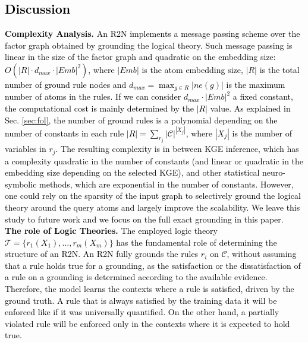 \documentclass[journal]{IEEEtran}
\newcommand{\mc}{\mathcal}
\newcommand{\ar}[1]{\textcolor{black}{#1}}
\begin{document}
\ar{\subsection{Discussion}\label{sec:discussion}}
\ar{{\bf Complexity Analysis. } An R2N implements a message passing scheme over the factor graph obtained by grounding the logical theory. Such message passing is linear in the size of the factor graph and quadratic on the embedding size: $O(|R| \cdot d_{max} \cdot |Emb|^2)$, where $|Emb|$ is the atom embedding size, $|R|$ is the total number of ground rule nodes and $d_{max} = \max_{g \in R} |ne(g)|$ is the maximum number of atoms in the rules.
If we can consider $d_{max} \cdot |Emb|^2$ a fixed constant, the computational cost is mainly determined by the $|R|$ value. As explained in Sec. \ref{sec:fol}, the number of ground rules is a polynomial depending on the number of constants in each rule $|R| = \sum_{r_j} |\mathcal{C}|^{|X_j|}$, where $|X_j|$ is the number of variables in $r_j$.
The resulting complexity is in between KGE inference, which has a complexity quadratic in the number of constants (and linear or quadratic in the embedding size depending on the selected KGE), and other statistical neuro-symbolic methods, which are exponential in the number of constants. However, one could rely on the sparsity of the input graph to selectively ground the logical theory around the query atoms and largely improve the scalability. We leave this study to future work and we focus on the full exact grounding in this paper.
\\
{\bf The role of Logic Theories. } The employed logic theory $\mc{T}=\{r_1(X_1),\ldots,r_m(X_m)\}$ %
has the fundamental role of determining the structure of an R2N.
An R2N fully grounds the rules $r_i$ on $\mc{C}$, without assuming that a rule holds true for a grounding, as the satisfaction or the dissatisfaction of a rule on a grounding is determined according to the available evidence. Therefore, the model learns the contexts where a rule is satisfied, driven by the ground truth. A rule that is always satisfied by the training data it will be enforced like if it was universally quantified. On the other hand, a partially violated rule will be enforced only in the contexts where it is expected to hold true. %
}
\end{document}
